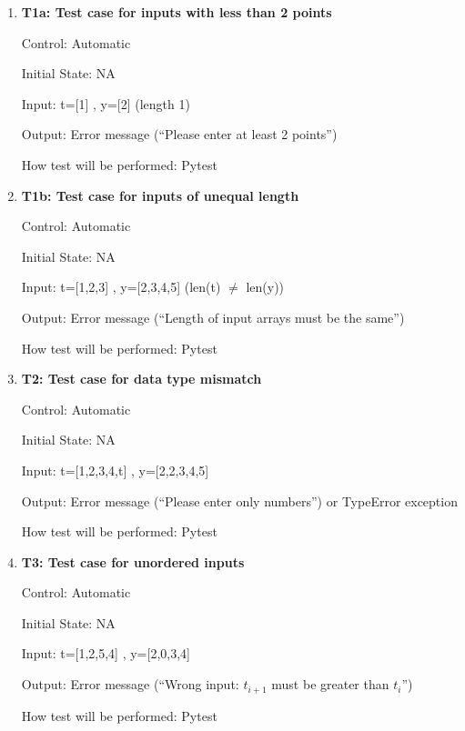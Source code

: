 \documentclass[12pt, titlepage]{article}
\begin{document}
\begin{enumerate}

\item{\textbf{T1a: Test case for inputs with less than 2 points 
}\\}\label{{T1a}}

Control: Automatic

Initial State: NA

Input: t=[1] , y=[2] (length 1)

Output: Error message (``Please enter at least  2 
points'')

How test will be performed: Pytest




\item{\textbf{T1b: Test case for inputs of unequal length }\\}\label{{T1b}}

Control: Automatic

Initial State: NA

Input: t=[1,2,3] , y=[2,3,4,5] (len(t) $\ne$ len(y))

Output: Error message (``Length of input arrays must be the same'')

How test will be performed: Pytest


\item{\textbf{T2: Test case for data type mismatch}\\}

Control: Automatic

Initial State: NA

Input: t=[1,2,3,4,t] , y=[2,2,3,4,5] 

Output: Error message (``Please enter only numbers'') or TypeError exception

How test will be performed: Pytest


\item{\textbf{T3: Test case for unordered inputs}\\}

Control: Automatic

Initial State: NA

Input: t=[1,2,5,4] , y=[2,0,3,4] 

Output: Error message (``Wrong input: $t_{i+1}$ must be greater than $t_i$'')

How test will be performed: Pytest




\end{enumerate}
\end{document}
